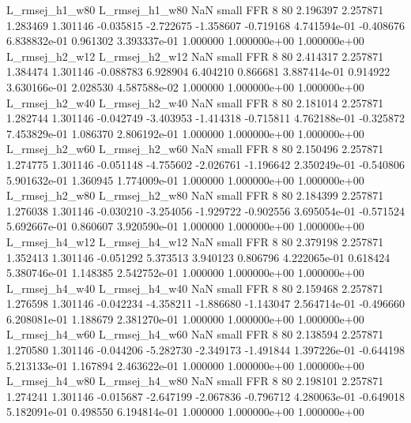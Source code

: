 L_rmsej_h1_w80 L_rmsej_h1_w80                   NaN      small      FFR                 8 80 2.196397       2.257871 1.283469       1.301146   -0.035815     -2.722675     -1.358607    -0.719168   4.741594e-01 -0.408676 6.838832e-01     0.961302   3.393337e-01            1.000000    1.000000e+00        1.000000e+00
L_rmsej_h2_w12 L_rmsej_h2_w12                   NaN      small      FFR                 8 80 2.414317       2.257871 1.384474       1.301146   -0.088783      6.928904      6.404210     0.866681   3.887414e-01  0.914922 3.630166e-01     2.028530   4.587588e-02            1.000000    1.000000e+00        1.000000e+00
L_rmsej_h2_w40 L_rmsej_h2_w40                   NaN      small      FFR                 8 80 2.181014       2.257871 1.282744       1.301146   -0.042749     -3.403953     -1.414318    -0.715811   4.762188e-01 -0.325872 7.453829e-01     1.086370   2.806192e-01            1.000000    1.000000e+00        1.000000e+00
L_rmsej_h2_w60 L_rmsej_h2_w60                   NaN      small      FFR                 8 80 2.150496       2.257871 1.274775       1.301146   -0.051148     -4.755602     -2.026761    -1.196642   2.350249e-01 -0.540806 5.901632e-01     1.360945   1.774009e-01            1.000000    1.000000e+00        1.000000e+00
L_rmsej_h2_w80 L_rmsej_h2_w80                   NaN      small      FFR                 8 80 2.184399       2.257871 1.276038       1.301146   -0.030210     -3.254056     -1.929722    -0.902556   3.695054e-01 -0.571524 5.692667e-01     0.860607   3.920590e-01            1.000000    1.000000e+00        1.000000e+00
L_rmsej_h4_w12 L_rmsej_h4_w12                   NaN      small      FFR                 8 80 2.379198       2.257871 1.352413       1.301146   -0.051292      5.373513      3.940123     0.806796   4.222065e-01  0.618424 5.380746e-01     1.148385   2.542752e-01            1.000000    1.000000e+00        1.000000e+00
L_rmsej_h4_w40 L_rmsej_h4_w40                   NaN      small      FFR                 8 80 2.159468       2.257871 1.276598       1.301146   -0.042234     -4.358211     -1.886680    -1.143047   2.564714e-01 -0.496660 6.208081e-01     1.188679   2.381270e-01            1.000000    1.000000e+00        1.000000e+00
L_rmsej_h4_w60 L_rmsej_h4_w60                   NaN      small      FFR                 8 80 2.138594       2.257871 1.270580       1.301146   -0.044206     -5.282730     -2.349173    -1.491844   1.397226e-01 -0.644198 5.213133e-01     1.167894   2.463622e-01            1.000000    1.000000e+00        1.000000e+00
L_rmsej_h4_w80 L_rmsej_h4_w80                   NaN      small      FFR                 8 80 2.198101       2.257871 1.274241       1.301146   -0.015687     -2.647199     -2.067836    -0.796712   4.280063e-01 -0.649018 5.182091e-01     0.498550   6.194814e-01            1.000000    1.000000e+00        1.000000e+00

